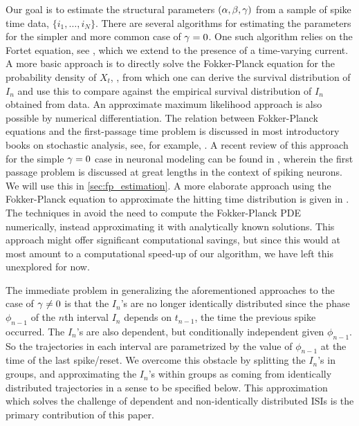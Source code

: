 Our goal is to estimate the structural parameters $({\alpha,\beta,{\gamma } })$ from a sample of
spike time data, $\{i_1,\ldots,i_N\}$. There are several algorithms for
estimating the parameters for the simpler and more common case of ${\gamma } = 0$. One
such algorithm relies on the Fortet equation, see
\cite{Ditlevsen2008,Ditlevsen2007}, which we extend to the presence of a
time-varying current. A more basic approach is to directly solve the
Fokker-Planck equation for the probability density of $X_t$,
\cite{Sirovich2011a,Paninski2004,Dong2011}, from which one can derive the
survival distribution of $I_n$ and use this to compare against the empirical
survival distribution of $I_n$ obtained from data. An approximate maximum
likelihood approach is also possible by numerical differentiation. The relation
between Fokker-Planck equations and the first-passage time problem is discussed
in most introductory books on stochastic analysis, see, for example,
\cite{Jacobs}. A recent review of this approach for the simple ${\gamma }=0$ case in
neuronal modeling can be found in \cite{Sirovich2011a}, wherein the first
passage problem is discussed at great lengths in the context of spiking neurons.
We will use this in \cref{sec:fp_estimation}. A more elaborate approach using
the Fokker-Planck equation to approximate the hitting time distribution is given
in \cite{Lo2006}. The techniques in \cite{Lo2006} avoid the need to compute the
Fokker-Planck PDE numerically, instead approximating it with analytically known
solutions. This approach might offer significant computational savings, but
since this would at most amount to a computational speed-up of our algorithm, we
have left this unexplored for now.


The immediate problem in generalizing the aforementioned approaches to the case
of ${\gamma } \neq 0$ is that the $I_n$'s are no longer identically distributed since
the phase $\phi_{n-1}$ of the $n$th interval $I_n$ depends on $t_{n-1}$, the
time the previous spike occurred. The $I_n$'s are also dependent, but conditionally
independent given $\phi_{n-1}$. So the trajectories in each interval are
parametrized by the value of $\phi_{n-1}$ at the time of the last spike/reset.
We overcome this obstacle by splitting the $I_n$'s in groups, and
approximating the $I_n$'s within groups as coming from identically
distributed trajectories in a sense to be specified below. This approximation
which solves the challenge of dependent and non-identically distributed ISIs is
the primary contribution of this paper.

